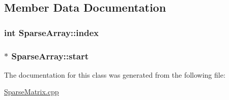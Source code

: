 \subsection{Member Data Documentation}
\subsubsection[{\texorpdfstring{index}{index}}]{\setlength{\rightskip}{0pt plus 5cm}int Sparse\+Array\+::index\hspace{0.3cm}{\ttfamily [private]}}\hypertarget{classSparseArray_af5a1db82e35f728926e98d3301a29130}{}\label{classSparseArray_af5a1db82e35f728926e98d3301a29130}
\subsubsection[{\texorpdfstring{start}{start}}]{$\ast$ Sparse\+Array\+::start\hspace{0.3cm}{\ttfamily [private]}}\hypertarget{classSparseArray_a57186d34f863d9aeb8fb8b9979db63c5}{}\label{classSparseArray_a57186d34f863d9aeb8fb8b9979db63c5}


The documentation for this class was generated from the following file\+:\begin{DoxyCompactItemize}
\item 
\hyperlink{SparseMatrix_8cpp}{Sparse\+Matrix.\+cpp}\end{DoxyCompactItemize}
